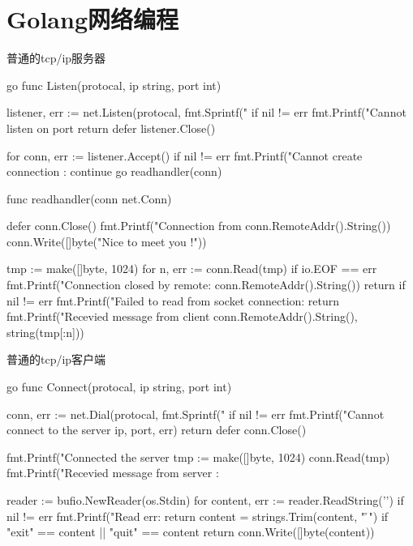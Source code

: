 \section{Golang网络编程}
\begin{outline}[enumerate]

  \1 普通的tcp/ip服务器

\begin{code-block}{go}
func Listen(protocal, ip string, port int) {
    listener, err := net.Listen(protocal, fmt.Sprintf("%
    if nil != err {
        fmt.Printf("Cannot listen on port %
        return
    }
    defer listener.Close()

    for {
        conn, err := listener.Accept()
        if nil != err {
            fmt.Printf("Cannot create connection :%
            continue
        }
        go readhandler(conn)
    }
}

func readhandler(conn net.Conn) {
    defer conn.Close()
    fmt.Printf("Connection from %
    conn.RemoteAddr().String())
    conn.Write([]byte("Nice to meet you !\n"))

    tmp := make([]byte, 1024)
    for {
        n, err := conn.Read(tmp)
        if io.EOF == err {
            fmt.Printf("Connection closed by remote: %
            conn.RemoteAddr().String())
            return
        }
        if nil != err {
            fmt.Printf("Failed to read from socket connection:%
            return
        }
        fmt.Printf("Recevied message from client %
        conn.RemoteAddr().String(), string(tmp[:n]))
    }
}
\end{code-block}

  \1 普通的tcp/ip客户端

\begin{code-block}{go}
func Connect(protocal, ip string, port int) {
    conn, err := net.Dial(protocal, fmt.Sprintf("%
    if nil != err {
        fmt.Printf("Cannot connect to the server %
        ip, port, err)
        return
    }
    defer conn.Close()

    fmt.Printf("Connected the server %
    tmp := make([]byte, 1024)
    conn.Read(tmp)
    fmt.Printf("Recevied message from server :%

    reader := bufio.NewReader(os.Stdin)
    for {
        content, err := reader.ReadString('\n')
        if nil != err {
            fmt.Printf("Read err: %
            return
        }
        content = strings.Trim(content, " \r\n")
        if "exit" == content || "quit" == content {
            return
        }
        conn.Write([]byte(content))
    }
}
\end{code-block}


\end{outline}

